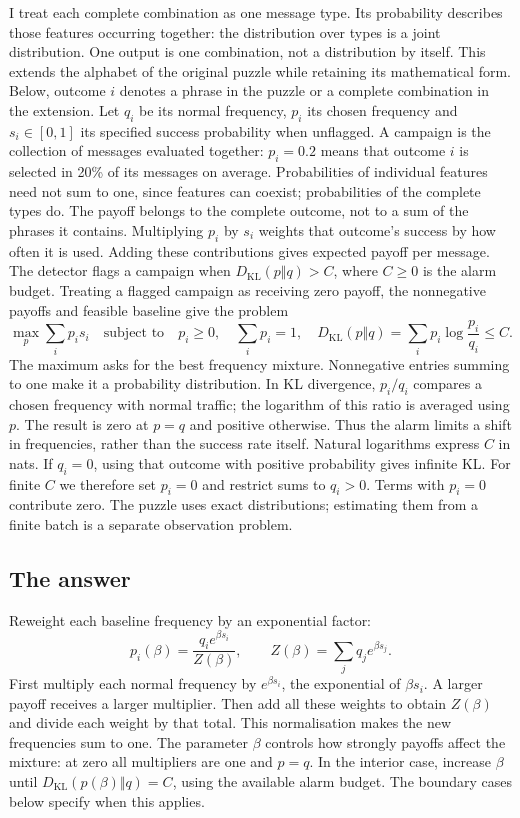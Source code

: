 \documentclass[11pt,a4paper]{article}
\newcommand{\KL}{D_{\mathrm{KL}}}
\begin{document}
I treat each complete combination as one message type. Its probability
describes those features occurring together: the distribution over types
is a joint distribution. One output is one combination, not a distribution
by itself. This extends the alphabet of the original puzzle while retaining
its mathematical form. Below, outcome $i$ denotes a phrase in the puzzle
or a complete combination in the extension. Let $q_i$ be its normal
frequency, $p_i$ its chosen frequency and $s_i\in[0,1]$ its specified success
probability when unflagged. A campaign is the collection of messages
evaluated together: $p_i=0.2$ means that outcome $i$ is selected in 20\%
of its messages on average. Probabilities of individual features need
not sum to one, since features can coexist; probabilities of the complete
types do. The payoff belongs to the complete outcome, not to a sum of
the phrases it contains.
Multiplying $p_i$ by $s_i$ weights that outcome's success by how often
it is used. Adding these contributions gives expected payoff per message.
The detector flags a campaign when $\KL(p\Vert q)>C$, where $C\geq0$
is the alarm budget. Treating a flagged campaign as receiving zero payoff,
the nonnegative payoffs and feasible baseline give the problem
\begin{equation}\label{eq:challenge}
 \max_p \sum_i p_i s_i
 \quad\text{subject to}\quad p_i\geq0,\quad \sum_i p_i=1,\quad
 \KL(p\Vert q)=\sum_i p_i\log\frac{p_i}{q_i}\leq C.
\end{equation}
The maximum asks for the best frequency mixture. Nonnegative entries
summing to one make it a probability distribution. In KL divergence,
$p_i/q_i$ compares a chosen frequency with normal traffic; the logarithm
of this ratio is averaged using $p$. The result is zero at $p=q$ and
positive otherwise. Thus the alarm limits a shift in frequencies, rather
than the success rate itself. Natural logarithms express $C$ in nats.
If $q_i=0$, using that outcome with positive probability gives infinite
KL. For finite $C$ we therefore set $p_i=0$ and restrict sums to $q_i>0$.
Terms with $p_i=0$ contribute zero. The puzzle uses exact distributions;
estimating them from a finite batch is a separate observation problem.

\subsection{The answer}
Reweight each baseline frequency by an exponential factor:
\begin{equation}\label{eq:tilt}
 p_i(\beta)=\frac{q_i e^{\beta s_i}}{Z(\beta)},
 \qquad Z(\beta)=\sum_j q_j e^{\beta s_j}.
\end{equation}
First multiply each normal frequency by $e^{\beta s_i}$, the exponential
of $\beta s_i$. A larger payoff receives a larger multiplier. Then add
all these weights to obtain $Z(\beta)$ and divide each weight by that
total. This normalisation makes the new frequencies sum to one.
The parameter $\beta$ controls how strongly payoffs affect the mixture:
at zero all multipliers are one and $p=q$. In the interior case,
increase $\beta$ until $\KL(p(\beta)\Vert q)=C$, using the available
alarm budget. The boundary cases below specify when this applies.
\end{document}
